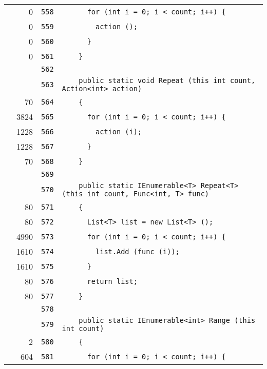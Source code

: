 \documentclass[a4paper,10pt]{article}
\begin{document}
\begin{longtable}[l]{lrrl}
\cellcolor{red} & 0 & \verb~558~ & \verb~      for (int i = 0; i < count; i++) {~\\
\cellcolor{red} & 0 & \verb~559~ & \verb~        action ();~\\
\cellcolor{red} & 0 & \verb~560~ & \verb~      }~\\
\cellcolor{red} & 0 & \verb~561~ & \verb~    }~\\
\cellcolor{gray} &  & \verb~562~ & \verb~~\\
\cellcolor{gray} &  & \verb~563~ & \verb~    public static void Repeat (this int count, Action<int> action)~\\
\cellcolor{green} & 70 & \verb~564~ & \verb~    {~\\
\cellcolor{green} & 3824 & \verb~565~ & \verb~      for (int i = 0; i < count; i++) {~\\
\cellcolor{green} & 1228 & \verb~566~ & \verb~        action (i);~\\
\cellcolor{green} & 1228 & \verb~567~ & \verb~      }~\\
\cellcolor{green} & 70 & \verb~568~ & \verb~    }~\\
\cellcolor{gray} &  & \verb~569~ & \verb~~\\
\cellcolor{gray} &  & \verb~570~ & \verb~    public static IEnumerable<T> Repeat<T> (this int count, Func<int, T> func)~\\
\cellcolor{green} & 80 & \verb~571~ & \verb~    {~\\
\cellcolor{green} & 80 & \verb~572~ & \verb~      List<T> list = new List<T> ();~\\
\cellcolor{green} & 4990 & \verb~573~ & \verb~      for (int i = 0; i < count; i++) {~\\
\cellcolor{green} & 1610 & \verb~574~ & \verb~        list.Add (func (i));~\\
\cellcolor{green} & 1610 & \verb~575~ & \verb~      }~\\
\cellcolor{green} & 80 & \verb~576~ & \verb~      return list;~\\
\cellcolor{green} & 80 & \verb~577~ & \verb~    }~\\
\cellcolor{gray} &  & \verb~578~ & \verb~~\\
\cellcolor{gray} &  & \verb~579~ & \verb~    public static IEnumerable<int> Range (this int count)~\\
\cellcolor{green} & 2 & \verb~580~ & \verb~    {~\\
\cellcolor{green} & 604 & \verb~581~ & \verb~      for (int i = 0; i < count; i++) {~\\

\end{longtable}
\end{document}
